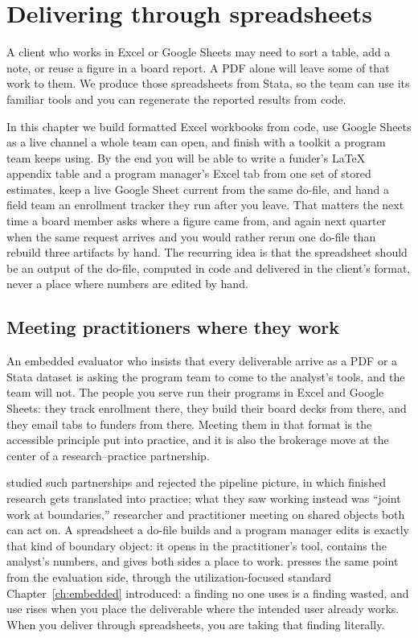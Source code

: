 \chapter{Delivering through spreadsheets}\label{ch:sheets}

A client who works in Excel or Google Sheets may need to sort a table, add a note, or reuse a figure in a board report. A PDF alone will leave some of that work to them. We produce those spreadsheets from Stata, so the team can use its familiar tools and you can regenerate the reported results from code.

In this chapter we build formatted Excel workbooks from code, use Google Sheets as a live channel a whole team can open, and finish with a toolkit a program team keeps using. By the end you will be able to write a funder's \LaTeX{} appendix table and a program manager's Excel tab from one set of stored estimates, keep a live Google Sheet current from the same do-file, and hand a field team an enrollment tracker they run after you leave. That matters the next time a board member asks where a figure came from, and again next quarter when the same request arrives and you would rather rerun one do-file than rebuild three artifacts by hand. The recurring idea is that the spreadsheet should be an output of the do-file, computed in code and delivered in the client's format, never a place where numbers are edited by hand.

\section{Meeting practitioners where they work}\label{sec:ch11-rationale}
An embedded evaluator who insists that every deliverable arrive as a PDF or a Stata dataset is asking the program team to come to the analyst's tools, and the team will not. The people you serve run their programs in Excel and Google Sheets: they track enrollment there, they build their board decks from there, and they email tabs to funders from there. Meeting them in that format is the accessible principle put into practice, and it is also the brokerage move at the center of a research--practice partnership.

\textcite{penuel2015partnerships} studied such partnerships and rejected the pipeline picture, in which finished research gets translated into practice; what they saw working instead was \enquote{joint work at boundaries,} researcher and practitioner meeting on shared objects both can act on. A spreadsheet a do-file builds and a program manager edits is exactly that kind of boundary object: it opens in the practitioner's tool, contains the analyst's numbers, and gives both sides a place to work. \textcite{patton2008utilization} presses the same point from the evaluation side, through the utilization-focused standard Chapter~\ref{ch:embedded} introduced: a finding no one uses is a finding wasted, and use rises when you place the deliverable where the intended user already works. When you deliver through spreadsheets, you are taking that finding literally.

